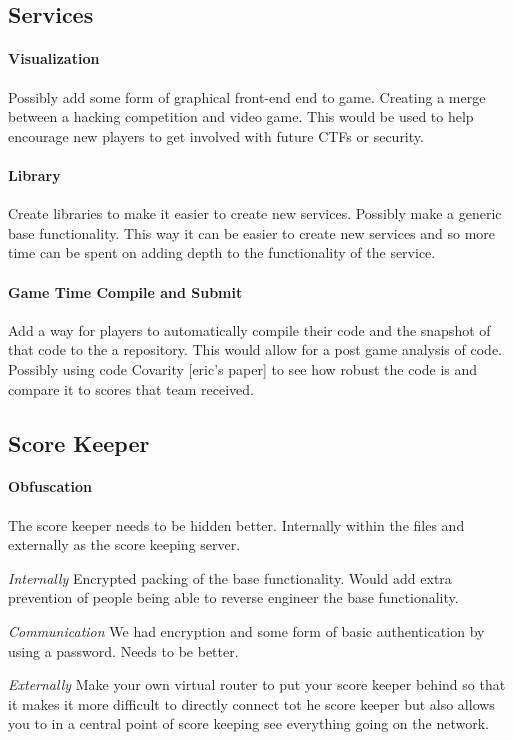 \documentclass[10pt]{article}
\begin{document}
\subsection{Services}

\paragraph{Visualization}
Possibly add some form of graphical front-end end to game. Creating a merge between
a hacking competition and video game. This would be used to help encourage new players
to get involved with future CTFs or security.

\paragraph{Library}
Create libraries to make it easier to create new services. Possibly make a generic base
functionality. This way it can be easier to create new services and so more time can
be spent on adding depth to the functionality of the service.

\paragraph{Game Time Compile and Submit}
Add a way for players to automatically compile their code and the snapshot of that code
to the a repository. This would allow for a post game analysis of code. Possibly using
code Covarity [eric's paper] to see how robust the code is and compare it to scores
that team received.

\subsection{Score Keeper}

\paragraph{Obfuscation}
The score keeper needs to be hidden better. Internally within the files and externally
as the score keeping server.

\textit{Internally}
Encrypted packing of the base functionality. Would add extra prevention of people being
able to reverse engineer the base functionality.

\textit{Communication}
We had encryption and some form of basic authentication by using a password.
Needs to be better.

\textit{Externally}
Make your own virtual router to put your score keeper behind so that it makes it
more difficult to directly connect tot he score keeper but also allows you to in a central
point of score keeping see everything going on the network.
\end{document}

